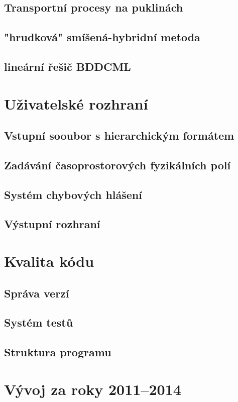 \documentclass[11pt]{article}
\begin{document}
\subsection{Transportní procesy na puklinách}
\subsection{"hrudková" smíšená-hybridní metoda}
\subsection{lineární řešič BDDCML}

\section{Uživatelské rozhraní}
\subsection{Vstupní sooubor s hierarchickým formátem}
\subsection{Zadávání časoprostorových fyzikálních polí}
\subsection{Systém chybových hlášení}
\subsection{Výstupní rozhraní}

\section{Kvalita kódu}
\subsection{Správa verzí}
\subsection{Systém testů}
\subsection{Struktura programu}



\section{Vývoj za roky 2011--2014}
\end{document}
